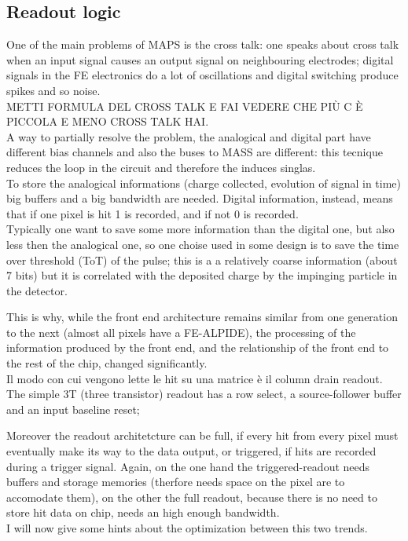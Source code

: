 \begin{titlepage}
\subsection{Readout logic}
One of the main problems of MAPS is the cross talk: one speaks about cross talk
when an input signal causes an output signal on neighbouring electrodes; digital signals
in the FE electronics do a lot of oscillations and digital switching produce spikes
and so noise.\\
METTI FORMULA DEL CROSS TALK E FAI VEDERE CHE PIÙ C È PICCOLA E MENO CROSS TALK HAI.\\
A way to partially resolve the problem, the analogical and digital part have different
bias channels and also the buses to MASS are different: this tecnique reduces the
loop in the circuit and therefore the induces singlas.\\


To store the analogical informations (charge collected, evolution of signal in time)
big buffers and a big bandwidth are needed.
Digital information, instead, means that if one pixel is hit 1 is recorded, and if
not 0 is recorded.\\
Typically one want to save some more information than the digital one, but also
less then the analogical one, so one choise used in some design is to save the time over threshold
(ToT) of the pulse; this is a a relatively coarse information (about 7 bits) but it
is correlated with the deposited charge by the impinging particle in the detector.

This is why, while the front end architecture remains similar from one generation
to the next (almost all pixels have a FE-ALPIDE), the processing of the information
produced by the front end, and the relationship of the front end to the rest of
the chip, changed significantly.\\
Il modo con cui vengono lette le hit su una matrice è il column drain readout.\\
The simple 3T (three transistor) readout has a row select, a
source-follower buffer and an input baseline reset;

Moreover the readout architetcture can be full, if every hit from every pixel must eventually
make its way to the data output, or triggered, if hits are recorded during a trigger signal.
Again, on the one hand the triggered-readout needs buffers and storage memories
(therfore needs space on the pixel are to accomodate them), on the other the full readout,
because there is no need to store hit data on chip, needs an high enough bandwidth.\\
I will now give some hints about the optimization between this two trends.


\end{titlepage}
